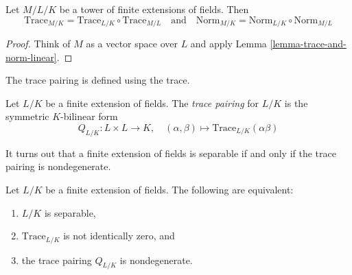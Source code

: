 \begin{lemma}
\label{lemma-trace-and-norm-tower}
Let $M/L/K$ be a tower of finite extensions of fields. Then
$$
\text{Trace}_{M/K} = \text{Trace}_{L/K} \circ \text{Trace}_{M/L}
\quad\text{and}\quad
\text{Norm}_{M/K} = \text{Norm}_{L/K} \circ \text{Norm}_{M/L}
$$
\end{lemma}

\begin{proof}
Think of $M$ as a vector space over $L$ and apply
Lemma \ref{lemma-trace-and-norm-linear}.
\end{proof}

\noindent
The trace pairing is defined using the trace.

\begin{definition}
\label{definition-trace-pairing}
Let $L/K$ be a finite extension of fields. The {\it trace pairing}
for $L/K$ is the symmetric $K$-bilinear form
$$
Q_{L/K} : L \times L \longrightarrow K,\quad
(\alpha, \beta) \longmapsto \text{Trace}_{L/K}(\alpha\beta)
$$
\end{definition}

\noindent
It turns out that a finite extension of fields is separable if and only
if the trace pairing is nondegenerate.

\begin{lemma}
\label{lemma-separable-trace-pairing}
Let $L/K$ be a finite extension of fields. The following are equivalent:
\begin{enumerate}
\item $L/K$ is separable,
\item $\text{Trace}_{L/K}$ is not identically zero, and
\item the trace pairing $Q_{L/K}$ is nondegenerate.
\end{enumerate}
\end{lemma}

